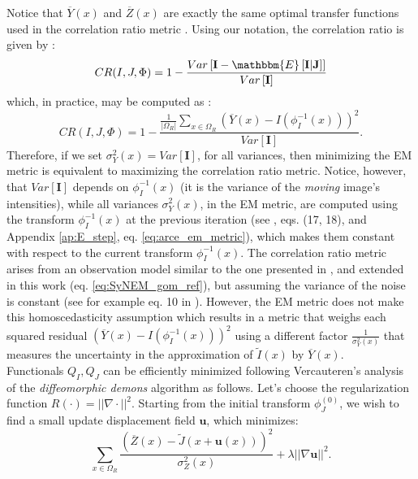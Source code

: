 Notice that $\overline{Y}(x)$ and $\overline{Z}(x)$ are exactly the same optimal transfer functions used in the correlation ratio metric \citep{Roche1998, Roche2000}. Using our notation, the correlation ratio is given by \citep[see][eq. 3]{Roche1998}:
\begin{equation}
    CR(I, J, \Phi) = 1 - \frac{Var\left[ \mathbf{I} - \mathbbm{E}\left[ \mathbf{I} | \mathbf{J}\right] \right]}{Var\left[ \mathbf{I} \right]}
\end{equation}
which, in practice, may be computed as \citep[see][eq. 4]{Roche1998}:
\begin{equation}
    CR(I, J, \Phi) = 1 - \frac{\frac{1}{|\Omega_{R}|}\sum_{x \in \Omega_{R}} \left(\overline{Y}(x) - I(\phi_{I}^{-1}(x))\right)^{2}}{Var\left[ \mathbf{I} \right]}.
\end{equation}
Therefore, if we set $\sigma^{2}_{Y}(x) = Var\left[ \mathbf{I}\right]$, for all variances, then minimizing the EM metric is equivalent to maximizing the correlation ratio metric. Notice, however, that $Var\left[ \mathbf{I}\right]$ depends on $\phi_{I}^{-1}(x)$ (it is the variance of the {\it moving} image's intensities), while all variances $\sigma^{2}_{Y}(x)$, in the EM metric, are computed using the transform $\phi_{I}^{-1}(x)$ at the previous iteration (see \cite{Arce-santana2014}, eqs. (17, 18),  and Appendix \ref{ap:E_step}, eq. \eqref{eq:arce_em_metric}), which makes them constant with respect to the current transform $\phi_{I}^{-1}(x)$. The correlation ratio metric arises from an observation model similar to the one presented in \cite{Arce-santana2014}, and extended in this work (eq. \eqref{eq:SyNEM_gom_ref}), but assuming the variance of the noise is constant (see for example eq. 10 in \citep{Roche2000}). However, the EM metric does not make this homoscedasticity assumption which results in a metric that weighs each squared residual $\left(\overline{Y}(x) - I(\phi_{I}^{-1}(x))\right)^{2}$ using a different factor $\frac{1}{\sigma^{2}_{Y}(x)}$ that measures the uncertainty in the approximation of $\tilde{I}(x)$ by $\overline{Y}(x)$.\\

Functionals $Q_{I}, Q_{J}$ can be efficiently minimized following Vercauteren's analysis of the \textit{diffeomorphic demons} algorithm \citep{Vercauteren2009} as follows.
Let's choose the regularization function $R(\cdot) = ||\nabla \cdot||^{2}$. Starting from the initial transform $\phi^{(0)}_{J}$, we wish to find a small update displacement field $\mathbf{u}$, which minimizes:
\begin{equation}\label{eq:vercauteren_cost}
    \sum_{x \in \Omega_{R}} \frac{\left(\overline{Z}(x) - \tilde{J}(x + \mathbf{u}(x))\right)^{2}}{\sigma^{2}_{Z}(x)} + \lambda ||\nabla \mathbf{u}||^{2}.
\end{equation}

